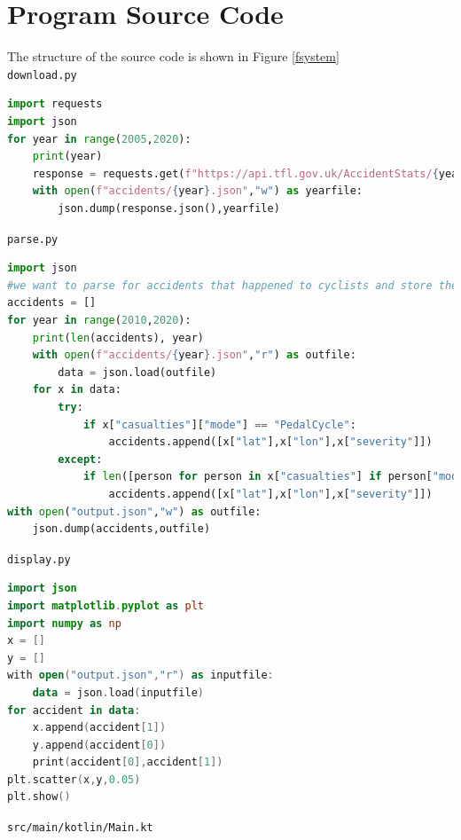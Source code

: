 \documentclass[11pt,twoside,a4paper]{report}
\begin{document}
\chapter{Program Source Code}
The structure of the source code is shown in Figure \ref{fsystem}\\
\texttt{download.py}
\begin{lstlisting}[language=python]
import requests
import json
for year in range(2005,2020):
    print(year)
    response = requests.get(f"https://api.tfl.gov.uk/AccidentStats/{year}")
    with open(f"accidents/{year}.json","w") as yearfile:
        json.dump(response.json(),yearfile)
\end{lstlisting}
\texttt{parse.py}
\begin{lstlisting}[language=python]
import json
#we want to parse for accidents that happened to cyclists and store the severity and the location
accidents = []
for year in range(2010,2020):
    print(len(accidents), year)
    with open(f"accidents/{year}.json","r") as outfile:
        data = json.load(outfile)
    for x in data:
        try:
            if x["casualties"]["mode"] == "PedalCycle":
                accidents.append([x["lat"],x["lon"],x["severity"]])
        except:
            if len([person for person in x["casualties"] if person["mode"] == "PedalCycle"]) >= 1:
                accidents.append([x["lat"],x["lon"],x["severity"]])
with open("output.json","w") as outfile:
    json.dump(accidents,outfile)
\end{lstlisting}
\texttt{display.py}
\begin{lstlisting}[language=kotlin]
import json
import matplotlib.pyplot as plt
import numpy as np
x = []
y = []
with open("output.json","r") as inputfile:
    data = json.load(inputfile)
for accident in data:
    x.append(accident[1])
    y.append(accident[0])
    print(accident[0],accident[1])
plt.scatter(x,y,0.05)
plt.show()
\end{lstlisting}
\texttt{src/main/kotlin/Main.kt}
\end{document}
